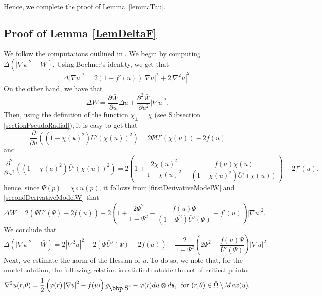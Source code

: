 \documentclass[11pt]{article}
\def\sp{\hbox{\bbp S}}
\newcommand{\abs}[1]{\left\vert #1 \right\vert}
\numberwithin{equation} {section}
\begin{document}
Hence, we complete the proof of Lemma~\ref{lemmaTau}.



\subsection{Proof of Lemma \ref{LemDeltaF}}\label{Appendix_LemDeltaF}

We follow the computations outlined in \cite[Section 4.1]{EMa}. We begin by computing $\Delta (\abs{\nabla u}^2-\bar{W})$. Using Bochner's identity, we get that
\[
\Delta \abs{\nabla u}^2 = 2 \left( 1-f' (u) \right) \abs{\nabla u}^2 + 2 \abs{\nabla^2 u}^2.
\]
On the other hand, we have that
\[
\Delta \bar W = \frac{\partial \bar W }{\partial u} \Delta u + \frac{\partial^2 \bar W}{\partial u^2} \abs{\nabla u}^2.
\]
Then, using the definition of the function $\chi_{\pm} = \chi$ (see Subsection \ref{sectionPseudoRadial}), it is easy to get that
\begin{equation}\label{firstDerivativeModelW}
	\frac{\partial}{\partial u}\left( (1-\chi (u) ^2) \bar{U}' (\chi (u))^2 \right)= 2 \Psi \bar{U}' (\chi (u)) -2 f(u)
\end{equation}
and
\begin{equation}\label{secondDerivativeModelW}
	\frac{\partial^2}{\partial u^2}\left( (1-\chi (u) ^2) \bar{U}' (\chi (u))^2 \right)= 2 \left( 1+ \frac{2 \chi (u)^2}{1-\chi (u)^2}-\frac{f (u) \chi (u)}{(1-\chi (u)^2) \bar{U}' (\chi (u))} \right)-2 f' (u),
\end{equation}
hence, since $\Psi (p) = \chi \circ u (p)$, it follows from \eqref{firstDerivativeModelW} and \eqref{secondDerivativeModelW} that
\[
\Delta \bar{W} =2 \left( \Psi \bar{U}' (\Psi) -2 f(u)\right)+ 2 \left( 1+ \frac{2 \Psi^2}{1-\Psi^2}-\frac{f (u) \Psi}{(1-\Psi^2) \bar{U}' (\Psi)}-f' (u) \right)\abs{\nabla u}^2.
\]
We conclude that
\begin{equation}\label{laplacianWs}
\Delta (\abs{\nabla u}^2-\bar{W}) =  2 \abs{\nabla^2 u}^2 - 2 \left( \Psi  \bar{U}' (\Psi) -2 f(u)\right)  -\frac{2}{1-\Psi^2} \left(2 \Psi^2 - \frac{f(u)\Psi}{\bar{U}' (\Psi)} \right)\abs{\nabla u}^2
\end{equation}
Next, we estimate the norm of the Hessian of $u$. To do so, we note that, for the model solution, the following relation is satisfied outside the set of critical points:
\[
\nabla^2 \bar{u} (r,\theta) = \frac{1}{2}\left( \varphi(r) \abs{\nabla u}^2 -f(\bar u) \right) g_{\sp^2}-\varphi(r) d\bar u \otimes d\bar u,\,  \text{ for }(r,\theta) \in \bar{\Omega} \setminus \textup{Max}(\bar u).
\]
\end{document}
